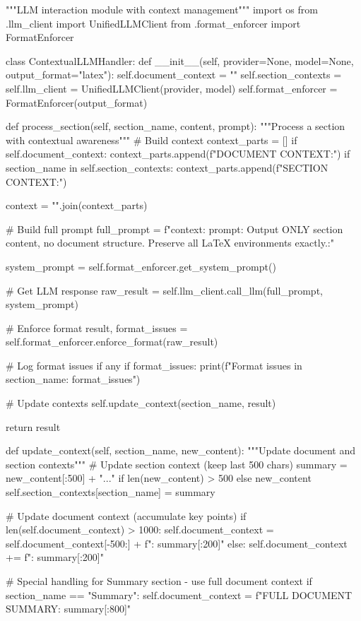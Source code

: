 """LLM interaction module with context management"""
import os
from .llm_client import UnifiedLLMClient
from .format_enforcer import FormatEnforcer

class ContextualLLMHandler:
    def __init__(self, provider=None, model=None, output_format="latex"):
        self.document_context = ""
        self.section_contexts = {}
        self.llm_client = UnifiedLLMClient(provider, model)
        self.format_enforcer = FormatEnforcer(output_format)
    
    def process_section(self, section_name, content, prompt):
        """Process a section with contextual awareness"""
        # Build context
        context_parts = []
        if self.document_context:
            context_parts.append(f"DOCUMENT CONTEXT:")
        if section_name in self.section_contexts:
            context_parts.append(f"SECTION CONTEXT:")
        
        context = "\n\n".join(context_parts)
        
        # Build full prompt
        full_prompt = f"{context}\n\nTASK: {prompt}\n\nIMPORTANT: Output ONLY section content, no document structure. Preserve all LaTeX environments exactly.\n\nCONTENT:"
        
        system_prompt = self.format_enforcer.get_system_prompt()
        
        # Get LLM response
        raw_result = self.llm_client.call_llm(full_prompt, system_prompt)
        
        # Enforce format
        result, format_issues = self.format_enforcer.enforce_format(raw_result)
        
        # Log format issues if any
        if format_issues:
            print(f"Format issues in {section_name}: {format_issues}")
        
        # Update contexts
        self.update_context(section_name, result)
        
        return result
    
    def update_context(self, section_name, new_content):
        """Update document and section contexts"""
        # Update section context (keep last 500 chars)
        summary = new_content[:500] + "..." if len(new_content) > 500 else new_content
        self.section_contexts[section_name] = summary
        
        # Update document context (accumulate key points)
        if len(self.document_context) > 1000:
            self.document_context = self.document_context[-500:] + f": {summary[:200]}"
        else:
            self.document_context += f": {summary[:200]}"
        
        # Special handling for Summary section - use full document context
        if section_name == "Summary":
            self.document_context = f"FULL DOCUMENT SUMMARY: {summary[:800]}"